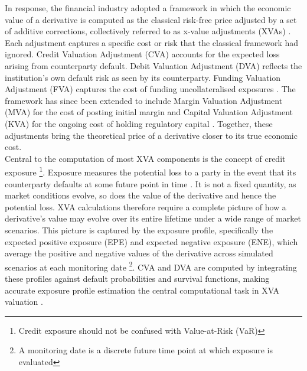     \noindent
    In response, the financial industry adopted a framework in which the economic value of a derivative is computed as the classical risk-free price adjusted by a set of additive corrections, collectively referred to as x-value adjustments (XVAs) \cite{Tsuchiya_2019}. Each adjustment captures a specific cost or risk that the classical framework had ignored. Credit Valuation Adjustment (CVA) accounts for the expected loss arising from counterparty default. Debit Valuation Adjustment (DVA) reflects the institution's own default risk as seen by its counterparty. Funding Valuation Adjustment (FVA) captures the cost of funding uncollateralised exposures \cite{Gregory_2015}. The framework has since been extended to include Margin Valuation Adjustment (MVA) for the cost of posting initial margin and Capital Valuation Adjustment (KVA) for the ongoing cost of holding regulatory capital \cite{Green_2016}. Together, these adjustments bring the theoretical price of a derivative closer to its true economic cost. \\ 

    \noindent
    Central to the computation of most XVA components is the concept of credit exposure \footnote{Credit exposure should not be confused with Value-at-Risk (VaR)}. Exposure measures the potential loss to a party in the event that its counterparty defaults at some future point in time \cite{Gregory_2015}. It is not a fixed quantity, as market conditions evolve, so does the value of the derivative and hence the potential loss. XVA calculations therefore require a complete picture of how a derivative's value may evolve over its entire lifetime under a wide range of market scenarios. This picture is captured by the exposure profile, specifically the expected positive exposure (EPE) and expected negative exposure (ENE), which average the positive and negative values of the derivative across simulated scenarios at each monitoring date \footnote{A monitoring date is a discrete future time point at which exposure is evaluated}. CVA and DVA are computed by integrating these profiles against default probabilities and survival functions, making accurate exposure profile estimation the central computational task in XVA valuation \cite{Gregory_2015}. \\


